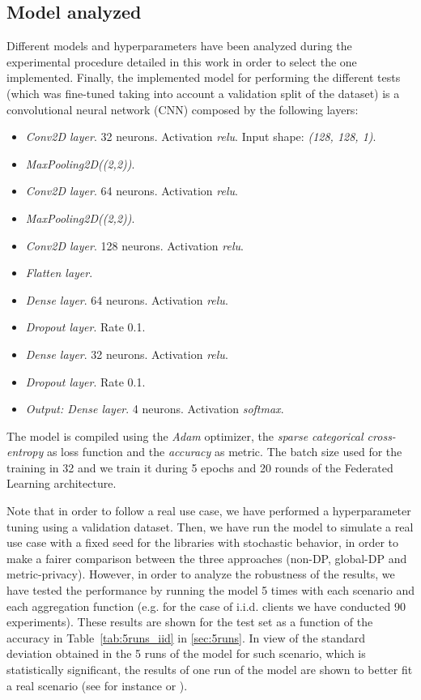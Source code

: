 \documentclass[5p,times]{elsarticle}
\begin{document}
\subsection{Model analyzed}\label{sec:model}

Different models and hyperparameters have been analyzed during the experimental procedure detailed in this work in order to select the one implemented. Finally, the implemented model for performing the different tests (which was fine-tuned taking into account a validation split of the dataset) is a convolutional neural network (CNN) composed by the following layers:

\begin{itemize}
    \item \textit{Conv2D layer}. 32 neurons. Activation \textit{relu}. Input shape: \textit{(128, 128, 1)}.
    \item \textit{MaxPooling2D((2,2))}.
    \item \textit{Conv2D layer}. 64 neurons. Activation \textit{relu}.
    \item \textit{MaxPooling2D((2,2))}.
    \item \textit{Conv2D layer}. 128 neurons. Activation \textit{relu}.
    \item \textit{Flatten layer}.
    \item \textit{Dense layer}. 64 neurons. Activation \textit{relu}.
    \item \textit{Dropout layer}. Rate 0.1.
    \item \textit{Dense layer}. 32 neurons. Activation \textit{relu}.
    \item \textit{Dropout layer}. Rate 0.1.
    \item \textit{Output: Dense layer}. 4 neurons. Activation \textit{softmax}.
\end{itemize}

The model is compiled using the \textit{Adam} optimizer, the \textit{sparse categorical cross-entropy} as loss function and the \textit{accuracy} as metric. The batch size used for the training in 32 and we train it during 5 epochs and 20 rounds of the Federated Learning architecture.

Note that in order to follow a real use case, we have performed a hyperparameter tuning using a validation dataset. Then, we have run the model to simulate a real use case with a fixed seed for the libraries with stochastic behavior, in order to make a fairer comparison between the three approaches (non-DP, global-DP and metric-privacy). However, in order to analyze the robustness of the results, we have tested the performance by running the model 5 times with each scenario and each aggregation function (e.g. for the case of i.i.d. clients we have conducted 90 experiments). These results are shown for the test set as a function of the accuracy in Table~\ref{tab:5runs_iid} in \ref{sec:5runs}. In view of the standard deviation obtained in the 5 runs of the model for such scenario, which is statistically significant, the results of one run of the model are shown to better fit a real scenario (see for instance \cite{adnan2022federated} or \cite{HATAMI2024128119}). 
\end{document}

